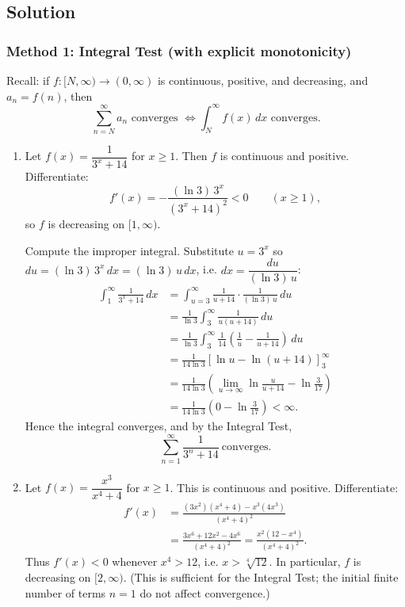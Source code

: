\documentclass[12pt]{article}
\begin{document}
\subsection*{Solution}

\subsubsection*{Method 1: Integral Test (with explicit monotonicity)}
Recall: if \(f:[N,\infty)\to(0,\infty)\) is continuous, positive, and decreasing, and \(a_n=f(n)\), then
\[
\sum_{n=N}^{\infty} a_n \text{ converges } \Longleftrightarrow \int_N^\infty f(x)\,dx \text{ converges.}
\]

\begin{enumerate}[label=(\alph*)]
\item Let \(f(x)=\dfrac{1}{3^x+14}\) for \(x\ge 1\). Then \(f\) is continuous and positive.
Differentiate:
\[
f'(x)= -\frac{(\ln 3)\,3^x}{(3^x+14)^2}<0\qquad (x\ge 1),
\]
so \(f\) is decreasing on \([1,\infty)\).

Compute the improper integral. Substitute \(u=3^x\) so \(du=(\ln 3)\,3^x\,dx=(\ln 3)\,u\,dx\), i.e. \(dx=\dfrac{du}{(\ln 3)\,u}\):
\begin{align*}
\int_1^\infty \frac{1}{3^x+14}\,dx
&=\int_{u=3}^{\infty}\frac{1}{u+14}\cdot \frac{1}{(\ln 3)\,u}\,du\\
&=\frac{1}{\ln 3}\int_{3}^{\infty}\frac{1}{u(u+14)}\,du\\
&=\frac{1}{\ln 3}\int_3^\infty \frac{1}{14}\left(\frac{1}{u}-\frac{1}{u+14}\right)\,du\\
&=\frac{1}{14\ln 3}\left[\ln u-\ln(u+14)\right]_{3}^{\infty}\\
&=\frac{1}{14\ln 3}\left(\lim_{u\to\infty}\ln\frac{u}{u+14}-\ln\frac{3}{17}\right)\\
&=\frac{1}{14\ln 3}\left(0-\ln\frac{3}{17}\right)<\infty.
\end{align*}
Hence the integral converges, and by the Integral Test,
\[
\boxed{\sum_{n=1}^{\infty}\frac{1}{3^n+14}\ \text{converges}.}
\]

\item Let \(f(x)=\dfrac{x^3}{x^4+4}\) for \(x\ge 1\). This is continuous and positive.
Differentiate:
\begin{align*}
f'(x)
&=\frac{(3x^2)(x^4+4)-x^3(4x^3)}{(x^4+4)^2}\\
&=\frac{3x^6+12x^2-4x^6}{(x^4+4)^2}
=\frac{x^2(12-x^4)}{(x^4+4)^2}.
\end{align*}
Thus \(f'(x)<0\) whenever \(x^4>12\), i.e. \(x>\sqrt[4]{12}\). In particular, \(f\) is decreasing on \([2,\infty)\). (This is sufficient for the Integral Test; the initial finite number of terms \(n=1\) do not affect convergence.)


\end{enumerate}
\end{document}
